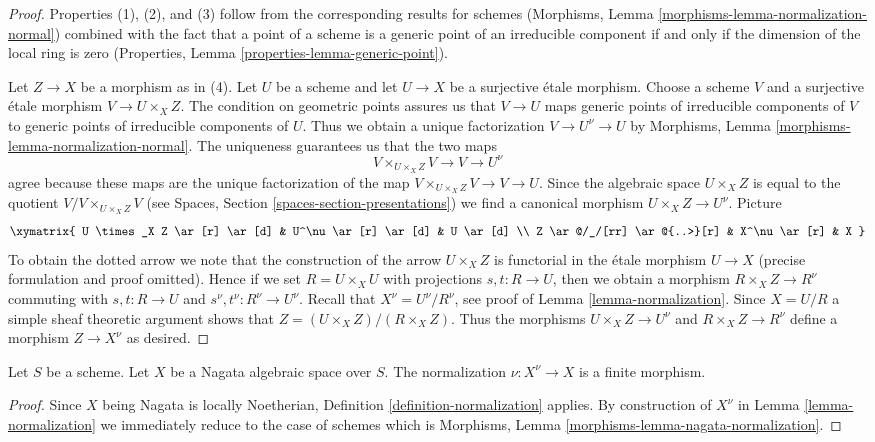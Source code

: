 \begin{proof}
Properties (1), (2), and (3) follow from the corresponding results
for schemes (Morphisms, Lemma \ref{morphisms-lemma-normalization-normal})
combined with the fact that a point of a scheme is a generic
point of an irreducible component if and only if the dimension
of the local ring is zero
(Properties, Lemma \ref{properties-lemma-generic-point}).

\medskip\noindent
Let $Z \to X$ be a morphism as in (4). Let $U$ be a scheme and let
$U \to X$ be a surjective \'etale morphism. Choose a scheme $V$ and
a surjective \'etale morphism $V \to U \times_X Z$. The condition on
geometric points assures us that $V \to U$ maps generic points of
irreducible components of $V$ to generic points of irreducible
components of $U$. Thus we obtain a unique factorization
$V \to U^\nu \to U$ by
Morphisms, Lemma \ref{morphisms-lemma-normalization-normal}.
The uniqueness guarantees us that the two maps
$$
V \times_{U \times_X Z} V \to V \to U^\nu
$$
agree because these maps are the unique factorization of the map
$V \times_{U \times_X Z} V \to V \to U$.
Since the algebraic space $U \times_X Z$ is equal to the quotient
$V/V \times_{U \times_X Z} V$
(see Spaces, Section \ref{spaces-section-presentations})
we find a canonical morphism
$U \times_X Z \to U^\nu$. Picture
$$
\xymatrix{
U \times_X Z \ar[r] \ar[d] & U^\nu \ar[r] \ar[d] & U \ar[d] \\
Z \ar@/_/[rr] \ar@{..>}[r] & X^\nu \ar[r] & X
}
$$
To obtain the dotted arrow we note that the construction of the
arrow $U \times_X Z$ is functorial in the \'etale morphism $U \to X$
(precise formulation and proof omitted).
Hence if we set $R = U \times_X U$ with projections $s, t : R \to U$,
then we obtain a morphism $R \times_X Z \to R^\nu$ commuting with
$s, t : R \to U$ and $s^\nu, t^\nu : R^\nu \to U^\nu$.
Recall that $X^\nu = U^\nu/R^\nu$, see proof of
Lemma \ref{lemma-normalization}. Since $X = U/R$ a
simple sheaf theoretic argument
shows that $Z = (U \times_X Z)/(R \times_X Z)$. Thus the morphisms
$U \times_X Z \to U^\nu$ and $R \times_X Z \to R^\nu$ define a
morphism $Z \to X^\nu$ as desired.
\end{proof}

\begin{lemma}
\label{lemma-nagata-normalization}
Let $S$ be a scheme. Let $X$ be a Nagata algebraic space over $S$.
The normalization $\nu : X^\nu \to X$ is a finite morphism.
\end{lemma}

\begin{proof}
Since $X$ being Nagata is locally Noetherian,
Definition \ref{definition-normalization} applies.
By construction of $X^\nu$ in Lemma \ref{lemma-normalization}
we immediately reduce to the case of schemes which is
Morphisms, Lemma \ref{morphisms-lemma-nagata-normalization}.
\end{proof}












